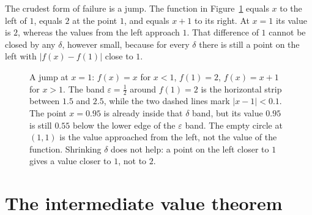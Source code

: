 The crudest form of failure is a jump. The function in
Figure~\ref{fig:lompat} equals $x$ to the left of $1$, equals $2$ at the point $1$,
and equals $x+1$ to its right. At $x=1$ its value is $2$, whereas the values from the
left approach $1$. That difference of $1$ cannot be closed by any $\delta$, however small,
because for every $\delta$ there is still a point on the left with $|f(x)-f(1)|$ close
to $1$.

\begin{figure}[htbp]
\centering
{}
\caption{A jump at $x=1$: $f(x)=x$ for $x<1$, $f(1)=2$, $f(x)=x+1$ for $x>1$.
The band $\varepsilon=\tfrac12$ around $f(1)=2$ is the horizontal strip between $1.5$ and
$2.5$, while the two dashed lines mark $|x-1|<0.1$. The point $x=0.95$ is already
inside that $\delta$ band, but its value $0.95$ is still $0.55$ below the lower edge of
the $\varepsilon$ band. The empty circle at $(1,1)$ is the value approached from the left,
not the value of the function. Shrinking $\delta$ does not help: a point on the left
closer to $1$ gives a value closer to $1$, not to $2$.}
\label{fig:lompat}
\end{figure}

\section{The intermediate value theorem}

